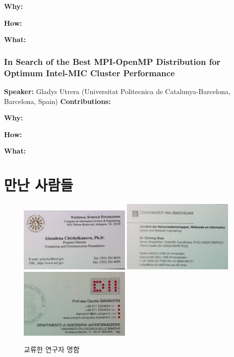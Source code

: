 \documentclass[twocolumn]{article}
\begin{document}
\noindent
\textbf{Why:}  

\noindent
\textbf{How:}  

\noindent
\textbf{What:}  

\subsubsection{In Search of the Best MPI-OpenMP Distribution for Optimum Intel-MIC Cluster Performance}
\textbf{Speaker:} Gladys Utrera (Universitat Politecnica de Catalunya-Barcelona, Barcelona, Spain)
\noindent
\textbf{Contributions:}  

\noindent
\textbf{Why:}  

\noindent
\textbf{How:}  

\noindent
\textbf{What:}  



\section{만난 사람들}

\begin{figure}[htb]
        \centering
        \includegraphics[width=0.48\textwidth]{nc01.png}
        \includegraphics[width=0.48\textwidth]{nc02.png}
        \includegraphics[width=0.48\textwidth]{nc03.png}
        \caption{교류한 연구자 명함}
        \label{fig:namecards01}
\end{figure}
\end{document}
